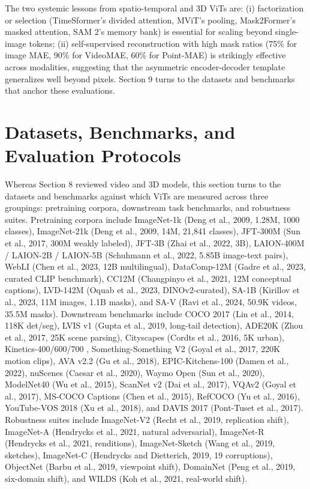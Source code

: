 \documentclass{article}
\begin{document}
The two systemic lessons from spatio-temporal and 3D ViTs are: (i) factorization or selection (TimeSformer's divided attention, MViT's pooling, Mask2Former's masked attention, SAM 2's memory bank) is essential for scaling beyond single-image tokens; (ii) self-supervised reconstruction with high mask ratios (75\% for image MAE, 90\% for VideoMAE, 60\% for Point-MAE) is strikingly effective across modalities, suggesting that the asymmetric encoder-decoder template generalizes well beyond pixels. Section 9 turns to the datasets and benchmarks that anchor these evaluations.

\section{Datasets, Benchmarks, and Evaluation Protocols}\label{datasets-benchmarks-and-evaluation-protocols}

Whereas Section 8 reviewed video and 3D models, this section turns to the datasets and benchmarks against which ViTs are measured across three groupings: pretraining corpora, downstream task benchmarks, and robustness suites. Pretraining corpora include ImageNet-1k (Deng et al., 2009, 1.28M, 1000 classes), ImageNet-21k (Deng et al., 2009, 14M, 21,841 classes), JFT-300M (Sun et al., 2017, 300M weakly labeled), JFT-3B (Zhai et al., 2022, 3B), LAION-400M / LAION-2B / LAION-5B (Schuhmann et al., 2022, 5.85B image-text pairs), WebLI (Chen et al., 2023, 12B multilingual), DataComp-12M (Gadre et al., 2023, curated CLIP benchmark), CC12M (Changpinyo et al., 2021, 12M conceptual captions), LVD-142M (Oquab et al., 2023, DINOv2-curated), SA-1B (Kirillov et al., 2023, 11M images, 1.1B masks), and SA-V (Ravi et al., 2024, 50.9K videos, 35.5M masks). Downstream benchmarks include COCO 2017 (Lin et al., 2014, 118K det/seg), LVIS v1 (Gupta et al., 2019, long-tail detection), ADE20K (Zhou et al., 2017, 25K scene parsing), Cityscapes (Cordts et al., 2016, 5K urban), Kinetics-400/600/700 \citep{kay2017thekineticshumanac}, Something-Something V2 (Goyal et al., 2017, 220K motion clips), AVA v2.2 (Gu et al., 2018), EPIC-Kitchens-100 (Damen et al., 2022), nuScenes (Caesar et al., 2020), Waymo Open (Sun et al., 2020), ModelNet40 (Wu et al., 2015), ScanNet v2 (Dai et al., 2017), VQAv2 (Goyal et al., 2017), MS-COCO Captions (Chen et al., 2015), RefCOCO (Yu et al., 2016), YouTube-VOS 2018 (Xu et al., 2018), and DAVIS 2017 (Pont-Tuset et al., 2017). Robustness suites include ImageNet-V2 (Recht et al., 2019, replication shift), ImageNet-A (Hendrycks et al., 2021, natural adversarial), ImageNet-R (Hendrycks et al., 2021, renditions), ImageNet-Sketch (Wang et al., 2019, sketches), ImageNet-C (Hendrycks and Dietterich, 2019, 19 corruptions), ObjectNet (Barbu et al., 2019, viewpoint shift), DomainNet (Peng et al., 2019, six-domain shift), and WILDS (Koh et al., 2021, real-world shift).
\end{document}
